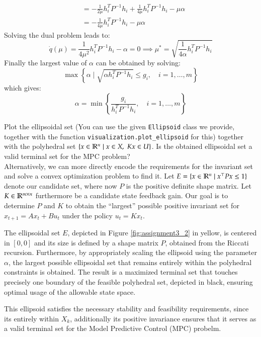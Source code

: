 \documentclass[]{article}
\begin{document}
\begin{flushleft}
\[\begin{aligned}
			&= - \frac{1}{2 \mu} h_i^T P^{-1} h_i + \frac{1}{4 \mu} h_i^T P^{-1} h_i - \mu \alpha \\
			&= - \frac{1}{4 \mu} h_i^T P^{-1} h_i - \mu \alpha
	\end{aligned}
	\]	
	Solving the dual problem leads to:
	\[
		\dot{q}(\mu) = \frac{1}{4 \mu^2} h_i^T P^{-1} h_i - \alpha = 0 \implies \mu^* = \sqrt{\frac{1}{4 \alpha} h_i^T P^{-1} h_i}
	\]
	Finally the largest value of $\alpha$ can be obtained by solving:
	\[ 
		\max \left\{ \alpha \mid \sqrt{ \alpha h_i^T P^{-1} h_i } \le g_i, \quad i = 1, \dots, m\right\}
	\]
	which gives: 
	\[ \alpha = \min \left\{ \frac{g_i}{h_i^T P^{-1} h_i}, \quad i = 1, \dots, m \right\} \]
\end{flushleft}



\begin{assignment}
	Plot the ellipsoidal set 
	(You can use the given \texttt{Ellipsoid} class we provide,
	together with the function \texttt{visualization.plot\_ellipsoid} for this)
	together with the polyhedral set $\{ x \in \mathbb{R}^n \mid x \in X,\; Kx \in U \}$.
	Is the obtained ellipsoidal set a valid terminal set for the MPC problem? \\

	Alternatively, we can more directly encode the requirements for the invariant set and solve a convex optimization problem 
	to find it. 
	Let $E = \{ x \in \mathbb{R}^n \mid x^\top P x \leq 1 \}$ denote our candidate set, where 
	now $P$ is the positive definite shape matrix. 
	Let $K \in \mathbb{R}^{m \times n}$ furthermore be a candidate state feedback gain.
	Our goal is to determine 
	$P$ and $K$ to obtain the ``largest'' possible positive invariant set for 
	$x_{t+1} = A x_t + B u_t$ under the policy $u_t = K x_t$.
\end{assignment}
\begin{flushleft}
	The ellipsoidal set $E$, depicted in Figure \ref{fig:assignment3_2} in yellow, is centered in $[0,0]$ and its size is defined by a shape matrix $P$, obtained from the Riccati recursion.
	Furthermore, by appropriately scaling the ellipsoid using the parameter $\alpha$, the largest possible ellipsoidal set that remains entirely within the polyhedral constraints is obtained. 
	The result is a maximized terminal set that touches precisely one boundary of the feasible polyhedral set, depicted in black, ensuring optimal usage of the allowable state space.
	
	This ellipsoid satisfies the necessary stability and feasibility requirements, since its entirely within $X_k$, additionally its positive invariance ensures 
	that it serves as a valid terminal set for the Model Predictive Control (MPC) probelm. 
\end{flushleft}
\end{document}
